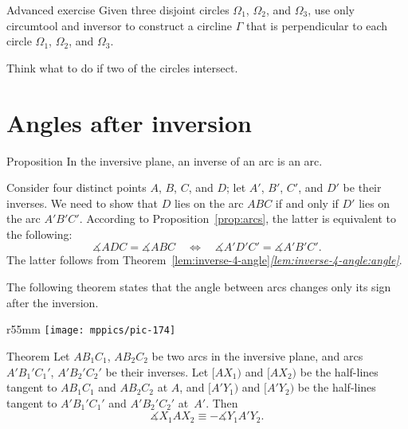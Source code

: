 \begin{thm}{Advanced exercise}\label{ex:3-construction-perp-clines}
Given  three disjoint circles $\Omega_1$, $\Omega_2$, and $\Omega_3$,
use only circumtool and inversor to construct a circline $\Gamma$ that is perpendicular to each circle $\Omega_1$, $\Omega_2$, and $\Omega_3$.

Think what to do if two of the circles intersect.
\end{thm}

\section{Angles after inversion}

\begin{thm}{Proposition}
In the inversive plane, an inverse of an arc is an arc.

\end{thm}

Consider four distinct points $A$, $B$, $C$, and $D$; 
let $A'$, $B'$, $C'$, and $D'$  be their inverses.
We need to show that $D$ lies on the arc $ABC$ if and only if $D'$ lies on the arc $A'B'C'$.
According to Proposition~\ref{prop:arcs},
the latter is equivalent to the following:
$$\measuredangle ADC= \measuredangle ABC
\quad
\iff
\quad  
\measuredangle A'D'C'= \measuredangle A'B'C'.$$
The latter follows from Theorem~\ref{lem:inverse-4-angle}\textit{\ref{lem:inverse-4-angle:angle}}.
\qeds

The following theorem states that the angle between arcs changes only its sign after the inversion.

{

\begin{wrapfigure}{r}{55mm}
\vskip-6mm
\centering
\texttt{[image: mppics/pic-174]}
\end{wrapfigure}

\begin{thm}{Theorem}\label{thm:angle-inversion}
Let $AB_1C_1$, $AB_2C_2$ be two arcs in the inversive plane,
and arcs $A'B_1'C_1'$, $A'B_2'C_2'$ be their inverses.
Let $[AX_1)$ and $[AX_2)$ be the half-lines tangent to $AB_1C_1$ and  $AB_2C_2$ at $A$,
and
$[A'Y_1)$ and $[A'Y_2)$ be the half-lines tangent to $A'B_1'C_1'$ and  $A'B_2'C_2'$ at~$A'$.
Then
$$\measuredangle X_1AX_2\equiv-\measuredangle Y_1A'Y_2.$$

\end{thm}

}

